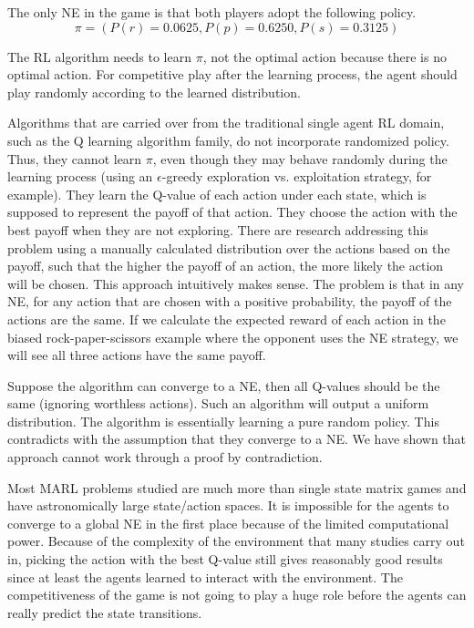 \documentclass[a4paper]{article}
\begin{document}
\begin{multicols}{2}
The only NE in the game is that both players adopt the following policy.
\begin{equation}
\pi=(P(r)=0.0625,P(p)=0.6250,P(s)=0.3125)
\label{eq:biasedrpspolicy}
\end{equation}

The RL algorithm needs to learn $\pi$, not the optimal action because there is no optimal action. For competitive play after the learning process, the agent should play randomly according to the learned distribution.

Algorithms that are carried over from the traditional single agent RL domain, such as the Q learning algorithm family, do not incorporate randomized policy. Thus, they cannot learn $\pi$, even though they may behave randomly during the learning process (using an $\epsilon$-greedy exploration vs. exploitation strategy, for example). They learn the Q-value of each action under each state, which is supposed to represent the payoff of that action. They choose the action with the best payoff when they are not exploring. There are research addressing this problem using a manually calculated distribution over the actions based on the payoff, such that the higher the payoff of an action, the more likely the action will be chosen. This approach intuitively makes sense. The problem is that in any NE, for any action that are chosen with a positive probability, the payoff of the actions are the same. If we calculate the expected reward of each action in the biased rock-paper-scissors example where the opponent uses the NE strategy, we will see all three actions have the same payoff.

Suppose the algorithm can converge to a NE, then all Q-values should be the same (ignoring worthless actions). Such an algorithm will output a uniform distribution. The algorithm is essentially learning a pure random policy. This contradicts with the assumption that they converge to a NE. We have shown that approach cannot work through a proof by contradiction.

Most MARL problems studied are much more than single state matrix games and have astronomically large state/action spaces. It is impossible for the agents to converge to a global NE in the first place because of the limited computational power. Because of the complexity of the environment that many studies carry out in, picking the action with the best Q-value still gives reasonably good results since at least the agents learned to interact with the environment. The competitiveness of the game is not going to play a huge role before the agents can really predict the state transitions.


\end{multicols}
\end{document}
